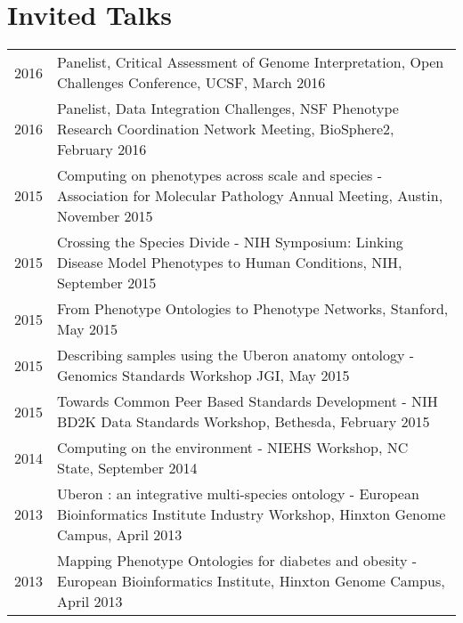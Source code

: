 \documentclass[11pt,fullpage]{article}
\begin{document}

\section*{Invited Talks}

\begin{longtable}{p{0.5in}|p{5.5in}}


 2016 & Panelist, Critical Assessment of Genome Interpretation, Open Challenges Conference, UCSF, March 2016\\ 

 2016 & Panelist, Data Integration Challenges, NSF Phenotype Research Coordination Network Meeting, BioSphere2, February 2016\\ 
 
 2015 & Computing on phenotypes across scale and species - Association for Molecular Pathology Annual Meeting,
  Austin, November 2015\\ 

 2015 & Crossing the Species Divide - NIH Symposium: Linking Disease Model Phenotypes to Human Conditions, 
  NIH, September 2015\\

 2015 & From Phenotype Ontologies to Phenotype Networks, 
  Stanford, May 2015\\

 2015 & Describing samples using the Uberon anatomy ontology - Genomics Standards Workshop
  JGI, May 2015\\

 2015 & Towards Common Peer Based Standards Development  - NIH BD2K Data Standards Workshop, 
  Bethesda, February 2015\\

 2014 & Computing on the environment - NIEHS Workshop, 
 NC State, September 2014\\

 2013 & Uberon : an integrative multi-species ontology - European Bioinformatics Institute Industry Workshop, 
 Hinxton Genome Campus, April 2013\\

 2013 & Mapping Phenotype Ontologies for diabetes and obesity - European Bioinformatics Institute, 
 Hinxton Genome Campus, April 2013\\


\end{longtable}
\end{document}
